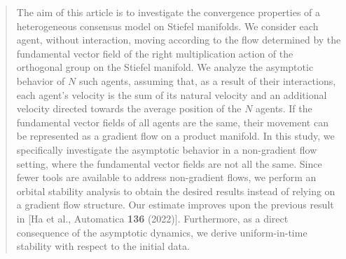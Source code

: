 \documentclass[11pt,reqno]{amsart}
\numberwithin{figure}{section}
\begin{document}
\begin{abstract}
%

The aim of this article is to investigate the convergence properties of a heterogeneous consensus model on Stiefel manifolds. We consider each agent, without interaction, moving according to the flow determined by the fundamental vector field of the right multiplication action of the orthogonal group on the Stiefel manifold. We analyze the asymptotic behavior of $N$ such agents, assuming that, as a result of their interactions, each agent's velocity is the sum of its natural velocity and an additional velocity directed towards the average position of the $N$ agents. If the fundamental vector fields of all agents are the same, their movement can be represented as a gradient flow on a product manifold. In this study, we specifically investigate the asymptotic behavior in a non-gradient flow setting, where the fundamental vector fields are not all the same. Since fewer tools are available to address non-gradient flows, we perform an orbital stability analysis to obtain the desired results instead of relying on a gradient flow structure. Our estimate improves upon the previous result in [Ha et al., Automatica {\bf 136} (2022)]. Furthermore, as a direct consequence of the asymptotic dynamics, we derive uniform-in-time stability with respect to the initial data.

 
% 
 
\end{abstract}

\end{document}
